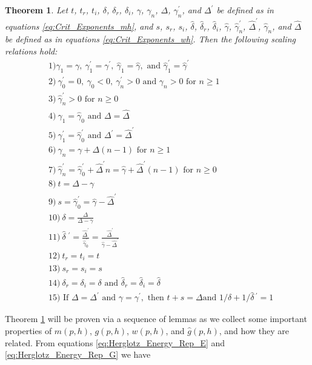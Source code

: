 \documentclass[english,12pt,jmp,graphicx]{revtex4-1}
\newtheorem{theorem}{Theorem}[section]
\newcommand{\gh}{\hat{\gamma}}
\newcommand{\Dh}{\hat{\Delta}}
\newcommand{\dha}{\hat{\delta}}
\begin{document}
\begin{theorem} \label{thm:Crit_Theory_m_w}
  Let $t$, $t_r$, $t_i$, $\delta$, $\delta_r$, $\delta_i$, $\gamma$, $\gamma_n$, $\Delta$, $\gamma_n^\prime$,
  and $\Delta^\prime$ be   defined as in equations \eqref{eq:Crit_Exponents_mh},
  and $s$, $s_r$, $s_i$, $\dha$, $\dha_r$, $\dha_i$, $\gh$, $\gh_n^\prime$,
  $\Dh^\prime$, $\gh_n$, and $\Dh$ be defined as in equations
  \eqref{eq:Crit_Exponents_wh}. Then the following scaling relations
  hold:
%  
  \begin{align*}   
   &1) \gamma_1=\gamma, \ \gamma_1^\prime=\gamma^\prime, \ \gh_1=\gh, \text{ and } \gh_1^\prime=\gh^\prime\\
   &2) \ \gamma_0^\prime=0, \ \gamma_0<0, \ \gamma_n^\prime>0 \text{ and } \gamma_n>0 \text{ for } n\geq1\\
   &3) \ \gh_n^\prime>0 \text{ for } n\geq0\\
   &4) \ \gamma_1=\gh_0 \text{ and } \Delta=\Dh\\
   &5) \ \gamma_1^\prime=\gh_0^\prime \text{ and } \Delta^\prime=\Dh^\prime \\
   &6) \ \gamma_n=\gamma+\Delta(n-1) \text{ for } n\geq1 \\
   &7) \ \gh_n^\prime=\gh_0^\prime+\Dh^\prime n=\gh+\Dh^\prime(n-1) \text{ for } n\geq0 \\
   &8) \ t=\Delta-\gamma \\
   &9) \ s=\gh_0^\prime=\gh-\Dh^\prime \\
   &10) \ \delta=\frac{\Delta}{\Delta-\gamma} \\
   &11) \ \dha\;^\prime=\frac{\Dh^\prime}{\gh_0^\prime}=\frac{\Dh^\prime}{\gh-\Dh^\prime} \\
   &12) \ t_r=t_i=t \\
   &13) \ s_r=s_i=s \\
   &14) \ \delta_r=\delta_i=\delta \text{ and } \dha_r=\dha_i=\dha \\
   &15) \text{ If } \Delta=\Delta^\prime \text{ and } \gamma=\gamma^\prime, \text{ then } t+s=\Delta \text{
     and }  1/\delta+1/\dha\,^\prime=1
  \end{align*}
%  
\end{theorem}
%

Theorem \ref{thm:Crit_Theory_m_w} will be proven via a sequence of
lemmas as we collect some important properties of $m(p,h)$, $g(p,h)$,
$w(p,h)$, and $\hat{g}(p,h)$, and how they are related. From equations
\eqref{eq:Herglotz_Energy_Rep_E} and \eqref{eq:Herglotz_Energy_Rep_G}
we have   
\end{document}
